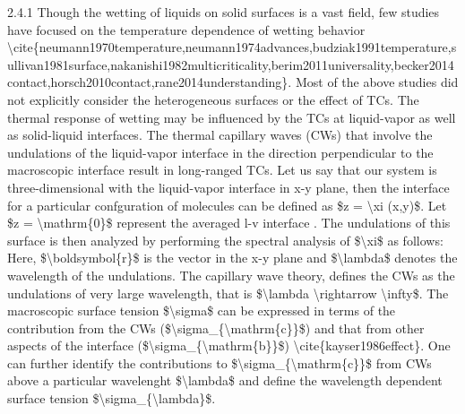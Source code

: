 \par 2.4.1 Though the wetting of liquids on solid surfaces is a vast field, few studies have focused on the temperature dependence of wetting behavior \textbackslash cite\{neumann1970temperature,neumann1974advances,budziak1991temperature,sullivan1981surface,nakanishi1982multicriticality,berim2011universality,becker2014contact,horsch2010contact,rane2014understanding\}. 
Most of the above studies did not explicitly consider the heterogeneous surfaces or the effect of TCs. The thermal response of wetting may be influenced by the TCs at liquid-vapor as well as solid-liquid interfaces. The thermal capillary waves (CWs) that involve the undulations of the liquid-vapor interface in the direction perpendicular to the macroscopic interface result in long-ranged TCs. Let us say that our system is three-dimensional with the liquid-vapor interface in x-y plane, then the interface for a particular confguration of molecules can be defined as \$z = \textbackslash xi (x,y)\$. Let \$z = \textbackslash mathrm\{0\}\$ represent the averaged l-v interface . The undulations of this surface is then analyzed by performing the spectral analysis of \$\textbackslash xi\$ as follows: Here, \$\textbackslash boldsymbol\{r\}\$ is the vector  in the x-y plane and \$\textbackslash lambda\$ denotes the wavelength of the undulations. The capillary wave theory, defines the CWs as the undulations of very large wavelength, that is \$\textbackslash lambda \textbackslash rightarrow \textbackslash infty\$. The macroscopic surface tension  \$\textbackslash sigma\$ can be expressed in terms of the contribution from the CWs (\$\textbackslash sigma\_\{\textbackslash mathrm\{c\}\}\$) and that from other aspects of the interface (\$\textbackslash sigma\_\{\textbackslash mathrm\{b\}\}\$) \textbackslash cite\{kayser1986effect\}. One can further identify the contributions to \$\textbackslash sigma\_\{\textbackslash mathrm\{c\}\}\$ from CWs above a particular wavelenght \$\textbackslash lambda\$ and define the wavelength dependent surface tension \$\textbackslash sigma\_\{\textbackslash lambda\}\$.
